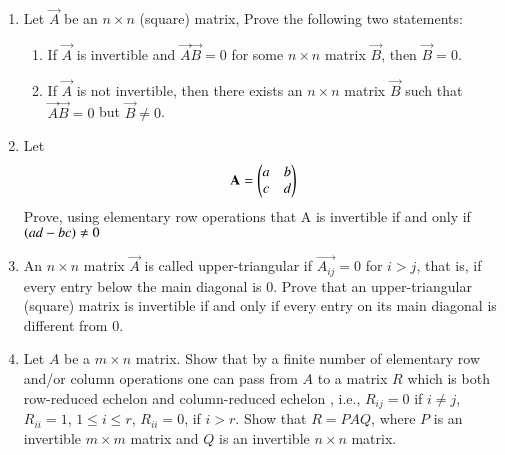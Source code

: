 \begin{enumerate}[label=\thesubsection.\arabic*.,ref=\thesubsection.\theenumi]
\solution

\item Let $\vec{A}$ be an $n \times n$ (square) matrix, Prove the following two statements:
 \begin{enumerate}
   \item If $\vec{A}$ is invertible and $\vec{A}\vec{B}=0$ for some $n \times n$ matrix $\vec{B}$, then $\vec{B}=0$.
   \item If $\vec{A}$ is not invertible, then there exists an $n \times n$ matrix $\vec{B}$ such that $\vec{A}\vec{B}=0$ but $\vec{B} \not= 0$.
 \end{enumerate}
%
\solution

%
\item Let
\begin{align}
    \mathbf{A} = \begin{pmatrix}a & b \\c & d\end{pmatrix}  \label{eq:solutions/1/5/8/given_matrix}
\end{align}
Prove, using elementary row operations that A is invertible if and only if $\left(ad - bc\right) \neq 0$
\\
%
\solution

\item An $n\times n$ matrix $\vec{A}$ is called upper-triangular if $\vec{A_{ij}}=0$ for $i>j$, that is, if every entry below the main diagonal is 0. Prove that an upper-triangular (square) matrix is invertible if and only if every entry on its main diagonal is different from 0.
\solution

\item Let $A$ be a $m\times n$ matrix. Show that by a finite number of elementary row and/or column operations one can pass from $A$ to a matrix $R$ which is both row-reduced echelon and column-reduced echelon , i.e., $R_{ij}=0$ if $i\neq j$, $R_{ii}=1$, $1\leq i\leq r$, $R_{ii}=0$, if $i>r$. Show that $R = PAQ$, where $P$ is an invertible $m\times m$ matrix and $Q$ is an invertible $n\times n$ matrix.
\\
\solution

\end{enumerate}


